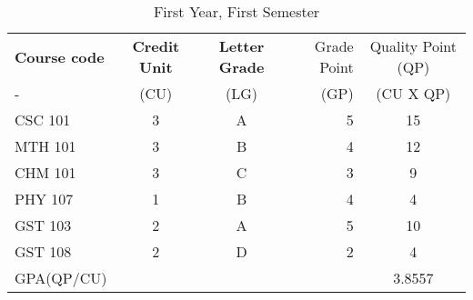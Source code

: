\documentclass{article}
\begin{document}
	\begin{table}[h!]
		\begin{center}
			\caption{First Year, First Semester}
			\label{tab:table1}
			\begin{tabular}{l|c|c|r|c}
				\textbf{Course code} & \textbf{Credit Unit} & \textbf{Letter Grade} & {Grade Point} & {Quality Point (QP)}\\
				- & (CU) & (LG) & (GP) & (CU X QP) \\
				\hline
		CSC 101 & 3 & A & 5 & 15\\
		MTH 101 & 3 & B & 4 & 12\\
		CHM 101 & 3 & C & 3 & 9\\
		PHY 107 & 1 & B & 4 & 4\\
		GST 103 & 2 & A & 5 & 10\\
		GST 108 & 2 & D & 2 & 4\\
		GPA(QP/CU) & & & & 3.8557\\
			\end{tabular}
		\end{center}
	\end{table}
\end{document}

